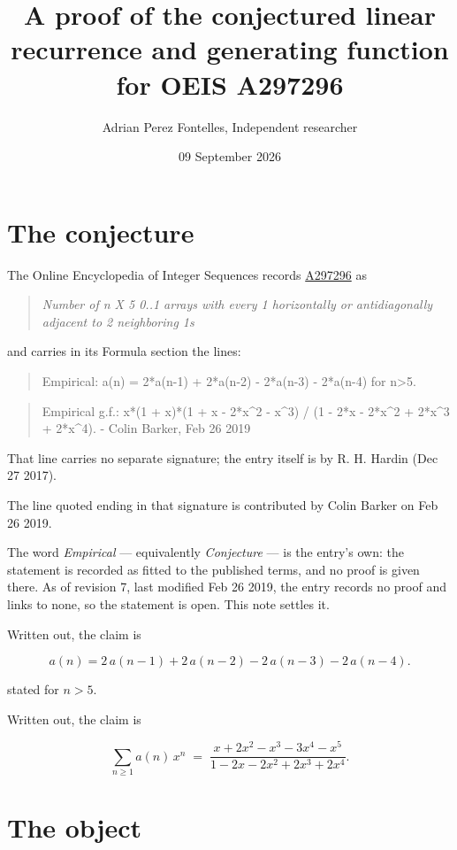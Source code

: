 \documentclass[11pt]{article}
\title{A proof of the conjectured linear recurrence and generating function for OEIS A297296}
\author{Adrian Perez Fontelles, Independent researcher}
\date{09 September 2026}
\theoremstyle{definition}
\begin{document}
\maketitle
\section{The conjecture}

The Online Encyclopedia of Integer Sequences records \href{https://oeis.org/A297296}{A297296} as

\begin{quote}\itshape Number of n X 5 0..1 arrays with every 1 horizontally or antidiagonally adjacent to 2 neighboring 1s\end{quote}

and carries in its Formula section the lines:

\begin{quote}\ttfamily Empirical: a(n) = 2*a(n-1) + 2*a(n-2) - 2*a(n-3) - 2*a(n-4) for n>5.\end{quote}

\begin{quote}\ttfamily Empirical g.f.: x*(1 + x)*(1 + x - 2*x\textasciicircum{}2 - x\textasciicircum{}3) / (1 - 2*x - 2*x\textasciicircum{}2 + 2*x\textasciicircum{}3 + 2*x\textasciicircum{}4). - Colin Barker, Feb 26 2019\end{quote}

That line carries no separate signature; the entry itself is by R. H. Hardin (Dec 27 2017).

The line quoted ending in that signature is contributed by Colin Barker on Feb 26 2019.

The word {\itshape Empirical} --- equivalently {\itshape Conjecture} --- is the entry's own: the statement is recorded as fitted to the published terms, and no proof is given there. As of revision 7, last modified Feb 26 2019, the entry records no proof and links to none, so the statement is open. This note settles it.

Written out, the claim is

\[a(n) = 2\,a(n-1) + 2\,a(n-2) - 2\,a(n-3) - 2\,a(n-4).\]

stated for $n > 5$.

Written out, the claim is

\[\sum_{n \ge 1} a(n)\,x^n \;=\; \frac{x + 2x^{2} - x^{3} - 3x^{4} - x^{5}}{1 - 2x - 2x^{2} + 2x^{3} + 2x^{4}}.\]

\section{The object}
\end{document}
